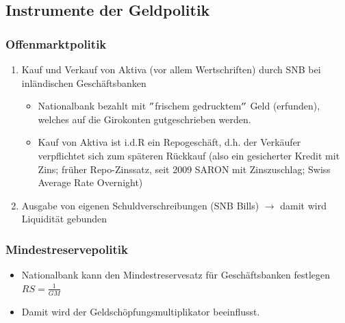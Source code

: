 \subsection{Instrumente der Geldpolitik}

\subsubsection{Offenmarktpolitik}
\begin{enumerate}
	\item Kauf und Verkauf von Aktiva (vor allem Wertschriften) durch SNB bei inländischen Geschäftsbanken
	\begin{itemize}
		\item Nationalbank bezahlt mit $"$frischem gedrucktem$"$ Geld (erfunden), welches auf die Girokonten gutgeschrieben werden.
		\item Kauf von Aktiva ist i.d.R ein Repogeschäft, d.h. der Verkäufer verpflichtet sich zum späteren Rückkauf (also ein gesicherter Kredit mit Zins; früher Repo-Zinssatz, seit 2009 SARON mit Zinszuschlag; Swiss Average Rate Overnight)
	\end{itemize}
	\item Ausgabe von eigenen Schuldverschreibungen (SNB Bills) $\rightarrow$ damit wird Liquidität gebunden
\end{enumerate}

\subsubsection{Mindestreservepolitik}
\begin{itemize}
	\item Nationalbank kann den Mindestreservesatz für Geschäftsbanken festlegen $RS = \frac{1}{GM}$
	\item Damit wird der Geldschöpfungsmultiplikator beeinflusst.
\end{itemize}

